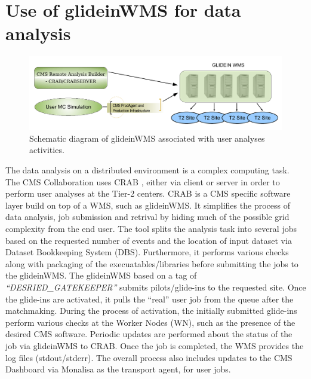 \documentclass[a4paper]{jpconf}
\begin{document}
\section{Use of glideinWMS for data analysis}
\begin{figure}
\begin{center}
\includegraphics[scale=0.4]{user_analysis}
\end{center}
\caption{Schematic diagram of glideinWMS associated with user analyses activities.}
\label{fig:user_analysis}
\end{figure}
The data analysis on a distributed environment is a complex computing task. The CMS Collaboration
uses CRAB \cite{bib:cms_crab}, either via client or server in order to perform user analyses at the Tier-2 centers.
CRAB is a CMS specific software layer build on top of a WMS, such as glideinWMS. It simplifies the process 
of data analysis, job submission and retrival by hiding much of the possible grid complexity from the
end user. The tool splits the analysis task into several jobs based on the requested number of events and
the location of input dataset via Dataset Bookkeeping System (DBS). Furthermore, it performs various checks along with 
packaging of the execuatables/libraries before submitting the jobs to the glideinWMS. The glideinWMS based 
on a tag of \emph{``DESRIED\_GATEKEEPER''} submits pilots/glide-ins to the requested site. Once the glide-ins are activated, 
it pulls the ``real'' user job from the queue after the matchmaking. During the process of activation, the 
initially submitted glide-ins perform various checks at the Worker Nodes (WN), such as the presence of the desired 
CMS software. Periodic updates are performed about the status of the job via glideinWMS to CRAB. Once the 
job is completed, the WMS provides the log files (stdout/stderr). The overall process also includes updates 
to the CMS Dashboard via Monalisa as the transport agent, for user jobs.
\end{document}
